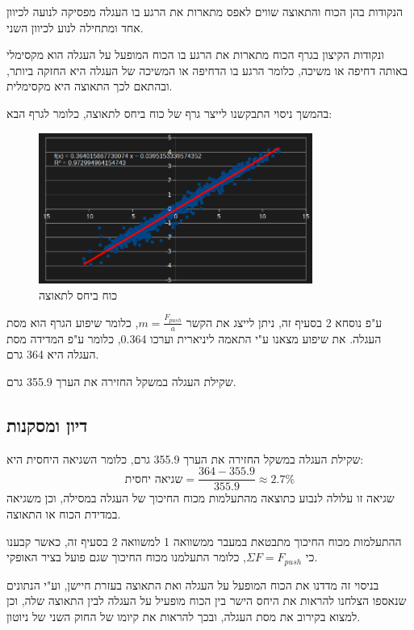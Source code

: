 \documentclass[14pt]{extarticle}
\begin{document}
הנקודות בהן הכוח והתאוצה שווים לאפס מתארות את הרגע בו העגלה מפסיקה לנועה  לכיוון אחד ומתחילה לנוע לכיוון השני.

ונקודות הקיצון בגרף הכוח מתארות את הרגע בו הכוח המופעל על העגלה הוא מקסימלי באותה דחיפה או משיכה, כלומר הרגע בו הדחיפה או המשיכה של העגלה היא החזקה ביותר, ובהתאם לכך התאוצה היא מקסימלית.

בהמשך ניסוי התבקשנו לייצר גרף של כוח ביחס לתאוצה, כלומר לגרף הבא:
\begin{figure}[H]
    \centering
    \includegraphics[width=0.8\textwidth]{maman_13_experiment_3_force_to_acceleration.png}
    \caption{כוח ביחס לתאוצה}
\end{figure}

ע"פ נוסחא 2 בסעיף זה, ניתן לייצג את הקשר $m = \frac{F_{push}}{a}$, כלומר שיפוע הגרף הוא מסת העגלה.
את שיפוע מצאנו ע"י התאמה ליניארית וערכו 0.364, כלומר ע"פ המדידה מסת העגלה היא 364 גרם.

שקילת העגלה במשקל החזירה את הערך 355.9 גרם.

\subsection*{דיון ומסקנות}
שקילת העגלה במשקל החזירה את הערך 355.9 גרם, כלומר השגיאה היחסית היא:
\begin{equation}
\text{שגיאה יחסית} = \frac{364 - 355.9}{355.9} \approx 2.7\%
\end{equation}
שגיאה זו עלולה לנבוע כתוצאה מהתעלמות מכוח החיכוך של העגלה במסילה, וכן משגיאה במדידת הכוח או התאוצה.

ההתעלמות מכוח החיכוך מתבטאת במעבר ממשוואה 1 למשוואה 2 בסעיף זה, כאשר קבענו כי $\Sigma F = F_{push}$, כלומר התעלמנו מכוח החיכוך שגם פועל בציר האופקי.

בניסוי זה מדדנו את הכוח המופעל על העגלה ואת התאוצה בעזרת חיישן, וע"י הנתונים שנאספו הצלחנו להראות את היחס הישר בין הכוח מופעיל על העגלה לבין התאוצה שלה, וכן למצוא בקירוב את מסת העגלה, ובכך להראות את קיומו של החוק השני של ניוטון.
\end{document}
